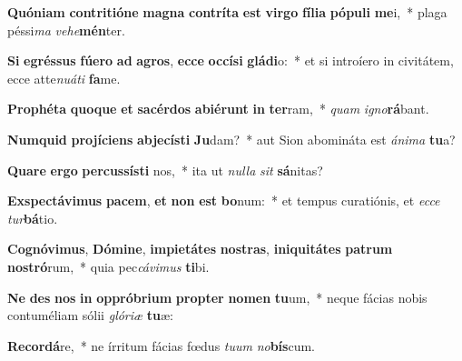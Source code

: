 \item \textbf{Quón}\textbf{i}\textbf{am} \textbf{con}\textbf{tri}\textbf{ti}\textbf{ó}\textbf{ne} \textbf{ma}\textbf{gna} \textbf{con}\textbf{trí}\textbf{ta} \textbf{est} \textbf{vir}\textbf{go} \textbf{fí}\textbf{li}\textbf{a} \textbf{pó}\textbf{pu}\textbf{li} \textbf{me}i,~* plaga péssi\textit{ma} \textit{ve}\textit{he}\textbf{mén}ter.
\item \textbf{Si} \textbf{e}\textbf{grés}\textbf{sus} \textbf{fú}\textbf{e}\textbf{ro} \textbf{ad} \textbf{a}\textbf{gros}, \textbf{ec}\textbf{ce} \textbf{oc}\textbf{cí}\textbf{si} \textbf{glá}\textbf{di}o:~* et si introíero in civitátem, ecce atte\textit{nu}\textit{á}\textit{ti} \textbf{fa}me.
\item \textbf{Pro}\textbf{phé}\textbf{ta} \textbf{quo}\textbf{que} \textbf{et} \textbf{sa}\textbf{cér}\textbf{dos} \textbf{ab}\textbf{i}\textbf{é}\textbf{runt} \textbf{in} \textbf{ter}ram,~* \textit{quam} \textit{i}\textit{gno}\textbf{rá}bant.
\item \textbf{Num}\textbf{quid} \textbf{pro}\textbf{jí}\textbf{ci}\textbf{ens} \textbf{ab}\textbf{je}\textbf{cís}\textbf{ti} \textbf{Ju}dam?~* aut Sion abomináta est \textit{á}\textit{ni}\textit{ma} \textbf{tu}a?
\item \textbf{Qua}\textbf{re} \textbf{er}\textbf{go} \textbf{per}\textbf{cus}\textbf{sís}\textbf{ti} nos,~* ita ut \textit{nul}\textit{la} \textit{sit} \textbf{sá}nitas?
\item \textbf{Ex}\textbf{spec}\textbf{tá}\textbf{vi}\textbf{mus} \textbf{pa}\textbf{cem}, \textbf{et} \textbf{non} \textbf{est} \textbf{bo}num:~* et tempus curatiónis, et \textit{ec}\textit{ce} \textit{tur}\textbf{bá}tio.
\item \textbf{Co}\textbf{gnó}\textbf{vi}\textbf{mus}, \textbf{Dó}\textbf{mi}\textbf{ne}, \textbf{im}\textbf{pi}\textbf{e}\textbf{tá}\textbf{tes} \textbf{nos}\textbf{tras}, \textbf{in}\textbf{i}\textbf{qui}\textbf{tá}\textbf{tes} \textbf{pa}\textbf{trum} \textbf{nos}\textbf{tró}rum,~* quia pec\textit{cá}\textit{vi}\textit{mus} \textbf{ti}bi.
\item \textbf{Ne} \textbf{des} \textbf{nos} \textbf{in} \textbf{op}\textbf{pró}\textbf{bri}\textbf{um} \textbf{prop}\textbf{ter} \textbf{no}\textbf{men} \textbf{tu}um,~* neque fácias nobis contuméliam sólii \textit{gló}\textit{ri}\textit{æ} \textbf{tu}æ:
\item \textbf{Re}\textbf{cor}\textbf{dá}re,~* ne írritum fácias fœdus \textit{tu}\textit{um} \textit{no}\textbf{bís}cum.
